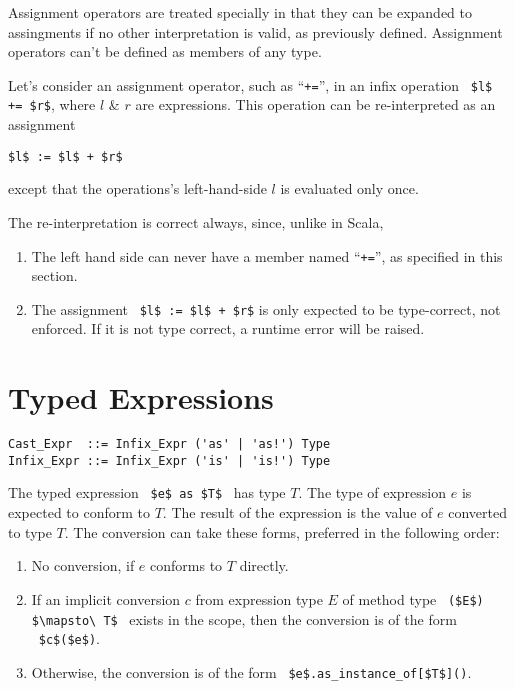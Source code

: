 Assignment operators are treated specially in that they can be expanded to assingments if no other interpretation is valid, as previously defined. Assignment operators can't be defined as members of any type. 

Let's consider an assignment operator, such as ``\lstinline!+=!'', in an infix operation ~\lstinline!$l$ += $r$!, where $l$ \& $r$ are expressions. This operation can be re-interpreted as an assignment
\begin{lstlisting}
$l$ := $l$ + $r$
\end{lstlisting}
except that the operations's left-hand-side $l$ is evaluated only once. 

The re-interpretation is correct always, since, unlike in Scala,
\begin{enumerate}
\item The left hand side can never have a member named ``\lstinline!+=!'', as specified in this section. 
\item The assignment ~\lstinline!$l$ := $l$ + $r$! is only expected to be type-correct, not enforced. If it is not type correct, a runtime error will be raised. 
\end{enumerate}





\section{Typed Expressions}
\label{sec:typed-expressions}

\syntax\begin{lstlisting}
Cast_Expr  ::= Infix_Expr ('as' | 'as!') Type
Infix_Expr ::= Infix_Expr ('is' | 'is!') Type
\end{lstlisting}

The typed expression ~\lstinline!$e$ as $T$!~ has type $T$. The type of expression $e$ is expected to conform to $T$. The result of the expression is the value of $e$ converted to type $T$. The conversion can take these forms, preferred in the following order:
\begin{enumerate}
\item No conversion, if $e$ conforms to $T$ directly. 
\item If an implicit conversion $c$ from expression type $E$ of method type ~\lstinline!($E$) $\mapsto\ T$!~ exists in the scope, then the conversion is of the form ~\lstinline!$c$($e$)!. 
\item Otherwise, the conversion is of the form ~\lstinline!$e$.as_instance_of[$T$]()!. 
\end{enumerate}

